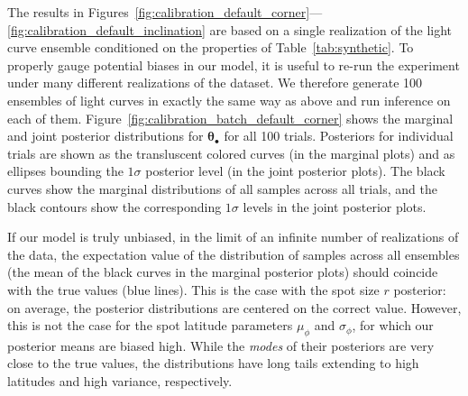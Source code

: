 \documentclass[modern]{aastex62}
\begin{document}
The results in
Figures~\ref{fig:calibration_default_corner}---\ref{fig:calibration_default_inclination}
are based on a single realization of the light curve ensemble conditioned on
the properties of Table~\ref{tab:synthetic}. To properly gauge potential biases
in our model, it is useful to re-run the experiment under many different realizations
of the dataset. We therefore generate 100 ensembles of light curves in
exactly the same way as above and run inference on each of them.
Figure~\ref{fig:calibration_batch_default_corner} shows the marginal and joint
posterior distributions for $\pmb{\theta}_\bullet$ for all 100 trials.
Posteriors for individual trials are shown as the transluscent colored curves
(in the marginal plots) and as ellipses bounding the $1\sigma$ posterior level
(in the joint posterior plots). The black curves show the marginal distributions of all
samples across all trials, and the black contours show the corresponding $1\sigma$
levels in the joint posterior plots.

If our model is truly unbiased, in the limit of an infinite number of realizations
of the data, the expectation value of the distribution
of samples across all ensembles (the mean of the black curves in the marginal
posterior plots) should coincide with the true values (blue lines).
This is the case with the spot size $r$ posterior: on average, the posterior
distributions are centered on the correct value.
However, this is not the case for
the spot latitude parameters $\mu_\phi$ and $\sigma_\phi$, for which our
posterior means are biased high. While the \emph{modes} of their
posteriors are very close to the true values, the distributions have long
tails extending to high latitudes and high variance, respectively.
\end{document}
